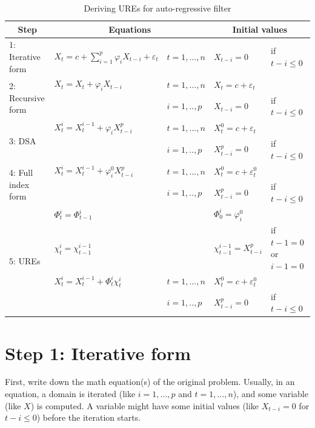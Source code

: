 \begin{table}[!ht]
\begin{tabular}{|l|ll|ll|}
\hline
    \multicolumn{1}{|c|}{\textbf{Step}} & \multicolumn{2}{|c|}{\textbf{Equations}} & \multicolumn{2}{|c|}{\textbf{Initial values}} \\\hline\hline
     \multirow{1}{*}{1: Iterative form}
        & $X_t=c+\sum\limits^p_{i=1}\varphi_i X_{t-i}+\varepsilon_t$    & $t=1, ..., n$   & $X_{t-i}=0$ &if $t-i \le 0$          \\\hline
     \multirow{2}{*}{2: Recursive form}
        & $X_t=X_t+\varphi_i X_{t-i}$                   & $t=1,...,n$ & $X_t=c+\varepsilon_t$ &  \\
        &                                         &   $i=1,..,p$      &  $X_{t-i}=0$ &if $t-i \le 0$ \\\hline        
     \multirow{2}{*}{3: DSA}
        & $X_t^i=X_t^{i-1}+\varphi_i X_{t-i}^p$         & $t=1,...,n$  & $X_t^{0}=c+\varepsilon_t$ & \\
        &                                         &  $i=1,..,p$& $X_{t-i}^p=0$ &if $t-i \le 0$\\\hline        
     \multirow{2}{*}{4: Full index form}
         & $X_t^i=X_t^{i-1}+\varphi_i^0 X_{t-i}^p$      & $t=1,...,n$ & $X_t^{0}=c+\varepsilon_t^0$  & \\
         & &$i=1,..,p$ & $X_{t-i}^p=0$ &if $t-i \le 0$\\\hline         
     \multirow{4}{*}{5: UREs}
         & $\Phi_t^i=\Phi_{t-1}^i$             && $\Phi_{0}^i=\varphi_i^0$  & \\
         & $\chi_t^i=\chi_{t-1}^{i-1}$         && $\chi_{t-1}^{i-1}=X_{t-i}^p$ &if $t-1=0$ or $i-1=0$ \\
         & $X_t^i=X_t^{i-1}+\Phi_t^i\chi_t^i$ &$t=1,...,n$ & $X_t^{0}=c+\varepsilon_t^0$ &\\
         & & $i=1,..,p$& $X_{t-i}^p=0$ &if $t-i \le 0$\\\hline         
\end{tabular}
\caption{Deriving UREs for auto-regressive filter}
\label{tab:deriving-ures-for-auto-regressive-filter}
\end{table}


\section{Step 1: Iterative form}

First, write down the math equation(s) of the original problem. Usually, in an  equation, a domain  is iterated (like $i=1,...,p$ and $t=1,...,n$),  and some variable (like $X$) is computed. A variable might have some initial values (like $X_{t-i}=0$ for $t-i \le 0$) before the iteration starts.

